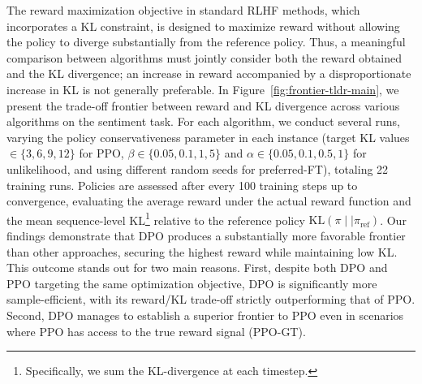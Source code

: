 The reward maximization objective in standard RLHF methods, which incorporates a KL constraint, is designed to maximize reward without allowing the policy to diverge substantially from the reference policy. Thus, a meaningful comparison between algorithms must jointly consider both the reward obtained and the KL divergence; an increase in reward accompanied by a disproportionate increase in KL is not generally preferable. In Figure~\ref{fig:frontier-tldr-main}, we present the trade-off frontier between reward and KL divergence across various algorithms on the sentiment task. For each algorithm, we conduct several runs, varying the policy conservativeness parameter in each instance (target KL values $\in\{3,6,9,12\}$ for PPO, $\beta \in \{0.05,0.1,1,5\}$ and $\alpha\in\{0.05,0.1,0.5,1\}$ for unlikelihood, and using different random seeds for preferred-FT), totaling 22 training runs. Policies are assessed after every 100 training steps up to convergence, evaluating the average reward under the actual reward function and the mean sequence-level KL\footnote{Specifically, we sum the KL-divergence at each timestep.} relative to the reference policy $\text{KL}\left(\pi\mid \mid \pi_\text{ref}\right)$. Our findings demonstrate that DPO produces a substantially more favorable frontier than other approaches, securing the highest reward while maintaining low KL. This outcome stands out for two main reasons. First, despite both DPO and PPO targeting the same optimization objective, DPO is significantly more sample-efficient, with its reward/KL trade-off strictly outperforming that of PPO. Second, DPO manages to establish a superior frontier to PPO even in scenarios where PPO has access to the true reward signal (PPO-GT).

